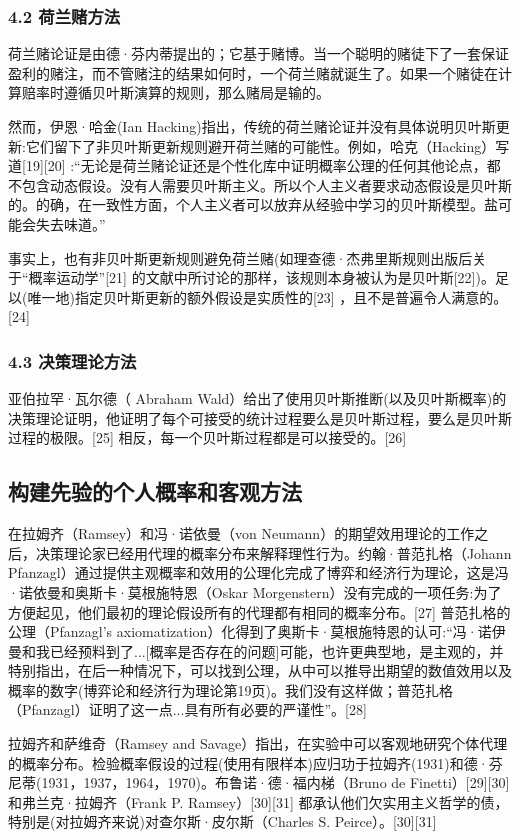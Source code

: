 \subsubsection{4.2 荷兰赌方法}

荷兰赌论证是由德·芬内蒂提出的；它基于赌博。当一个聪明的赌徒下了一套保证盈利的赌注，而不管赌注的结果如何时，一个荷兰赌就诞生了。如果一个赌徒在计算赔率时遵循贝叶斯演算的规则，那么赌局是输的。

然而，伊恩·哈金(Ian Hacking)指出，传统的荷兰赌论证并没有具体说明贝叶斯更新:它们留下了非贝叶斯更新规则避开荷兰赌的可能性。例如，哈克（Hacking）写道[19][20] :“无论是荷兰赌论证还是个性化库中证明概率公理的任何其他论点，都不包含动态假设。没有人需要贝叶斯主义。所以个人主义者要求动态假设是贝叶斯的。的确，在一致性方面，个人主义者可以放弃从经验中学习的贝叶斯模型。盐可能会失去味道。”

事实上，也有非贝叶斯更新规则避免荷兰赌(如理查德·杰弗里斯规则出版后关于“概率运动学”[21] 的文献中所讨论的那样，该规则本身被认为是贝叶斯[22])。足以(唯一地)指定贝叶斯更新的额外假设是实质性的[23] ，且不是普遍令人满意的。[24]

\subsubsection{4.3 决策理论方法}

亚伯拉罕·瓦尔德（ Abraham Wald）给出了使用贝叶斯推断(以及贝叶斯概率)的决策理论证明，他证明了每个可接受的统计过程要么是贝叶斯过程，要么是贝叶斯过程的极限。[25] 相反，每一个贝叶斯过程都是可以接受的。[26]

\subsection{构建先验的个人概率和客观方法}

在拉姆齐（Ramsey）和冯·诺依曼（von Neumann）的期望效用理论的工作之后，决策理论家已经用代理的概率分布来解释理性行为。约翰·普范扎格（Johann Pfanzagl）通过提供主观概率和效用的公理化完成了博弈和经济行为理论，这是冯·诺依曼和奥斯卡·莫根施特恩（Oskar Morgenstern）没有完成的一项任务:为了方便起见，他们最初的理论假设所有的代理都有相同的概率分布。[27] 普范扎格的公理（Pfanzagl's axiomatization）化得到了奥斯卡·莫根施特恩的认可:“冯·诺伊曼和我已经预料到了...[概率是否存在的问题]可能，也许更典型地，是主观的，并特别指出，在后一种情况下，可以找到公理，从中可以推导出期望的数值效用以及概率的数字(博弈论和经济行为理论第19页)。我们没有这样做；普范扎格（Pfanzagl）证明了这一点...具有所有必要的严谨性”。[28]

拉姆齐和萨维奇（Ramsey and Savage）指出，在实验中可以客观地研究个体代理的概率分布。检验概率假设的过程(使用有限样本)应归功于拉姆齐(1931)和德·芬尼蒂(1931，1937，1964，1970)。布鲁诺·德·福内梯（Bruno de Finetti）[29][30] 和弗兰克·拉姆齐（Frank P. Ramsey）[30][31] 都承认他们欠实用主义哲学的债，特别是(对拉姆齐来说)对查尔斯·皮尔斯（Charles S. Peirce）。[30][31]

